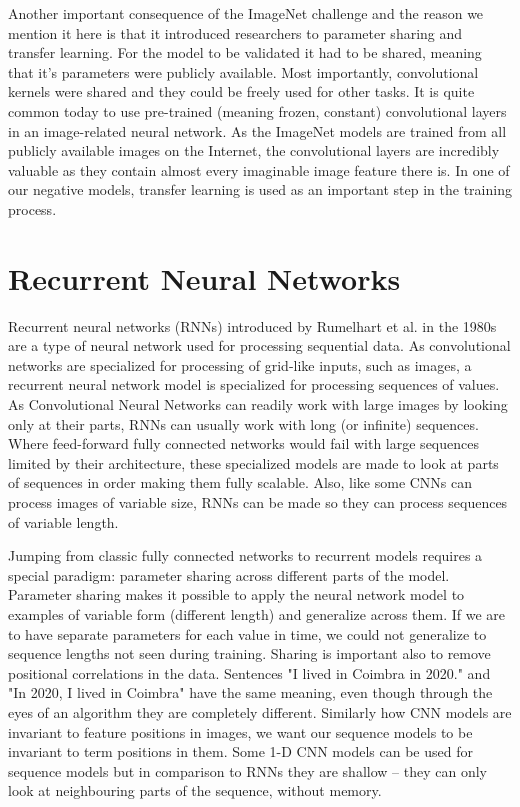 \documentclass[b5paper]{book}
\begin{document}
Another important consequence of the ImageNet challenge and the reason we mention it here is that it introduced researchers to parameter sharing and transfer learning. For the model to be validated it had to be shared, meaning that it's parameters were publicly available. Most importantly, convolutional kernels were shared and they could be freely used for other tasks. It is quite common today to use pre-trained (meaning frozen, constant) convolutional layers in an image-related neural network. As the ImageNet models are trained from all publicly available images on the Internet, the convolutional layers are incredibly valuable as they contain almost every imaginable image feature there is. In one of our negative models, transfer learning is used as an important step in the training process. 

\section{Recurrent Neural Networks}

Recurrent neural networks (RNNs) introduced by Rumelhart et al. in the 1980s are a type of neural network used for processing sequential data. As convolutional networks are specialized for processing of grid-like inputs, such as images, a recurrent neural network model is specialized for processing sequences of values. As Convolutional Neural Networks can readily work with large images by looking only at their parts, RNNs can usually work with long (or infinite) sequences. Where feed-forward fully connected networks would fail with large sequences limited by their architecture, these specialized models are made to look at parts of sequences in order making them fully scalable. Also, like some CNNs can process images of variable size, RNNs can be made so they can process sequences of variable length.

Jumping from classic fully connected networks to recurrent models requires a special paradigm: parameter sharing across different parts of the model. Parameter sharing makes it possible to apply the neural network model to examples of variable form (different length) and generalize across them. If we are to have separate parameters for each value in time, we could not generalize to sequence lengths not seen during training. Sharing is important also to remove positional correlations in the data. Sentences "I lived in Coimbra in 2020." and "In 2020, I lived in Coimbra" have the same meaning, even though through the eyes of an algorithm they are completely different. Similarly how CNN models are invariant to feature positions in images, we want our sequence models to be invariant to term positions in them. Some 1-D CNN models can be used for sequence models but in comparison to RNNs they are shallow -- they can only look at neighbouring parts of the sequence, without memory.
\end{document}
